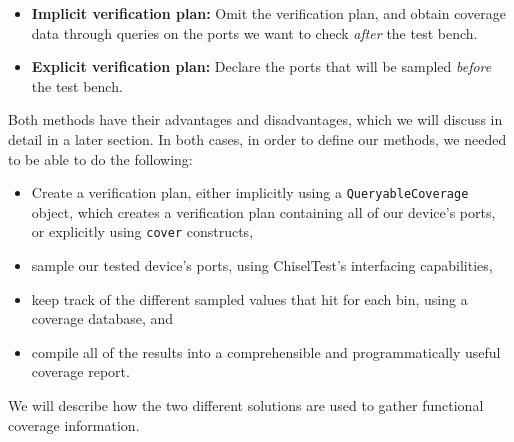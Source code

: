 \documentclass[conference]{IEEEtran}
\begin{document}
\begin{itemize}
	\item \textbf{Implicit verification plan:} Omit the verification plan, and obtain coverage data through queries on the ports we want to check \emph{after} the test bench.
	\item \textbf{Explicit verification plan:} Declare the ports that will be sampled \emph{before} the test bench.
\end{itemize}

Both methods have their advantages and disadvantages, which we will discuss in detail in a later section.
In both cases, in order to define our methods, we needed to be able to do the following:

\begin{itemize}
  \item Create a verification plan, either implicitly using a \texttt{QueryableCoverage} object, which creates a verification plan containing all of our device's ports, or explicitly using \texttt{cover} constructs, 
  \item sample our tested device's ports, using ChiselTest's interfacing capabilities, 
  \item keep track of the different sampled values that hit for each bin, using a coverage database, and 
  \item compile all of the results into a comprehensible and programmatically useful coverage report.
\end{itemize}

We will describe how the two different solutions are used to gather functional coverage information.
\end{document}
